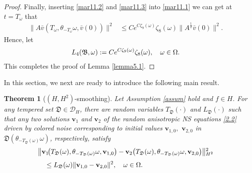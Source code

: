 \documentclass{elsarticle}
\newtheorem{theorem}{Theorem}[section]
\theoremstyle{definition}
\numberwithin{equation}{section}
\newcommand{\D}{\mathcal{D}}
\begin{document}
\begin{proof}
Finally, inserting     \eqref{mar11.2}  and \eqref{mar11.3}  into \eqref{mar11.1}  we can get at $t=T_\omega$ that
\begin{align}
 \|A\bar{v}(T_\omega ,\theta_{-T_\omega }\omega,\bar{v}(0))\|^2
&\leq Ce^{ C \zeta_9(\omega) } \zeta_8(\omega) \|A^\frac12\bar{v}(0)\|^2. \nonumber
\end{align}
Hence, let
\begin{align*}
 L_4 (\mathfrak B, \omega) :=   Ce^{ C \zeta_9(\omega) } \zeta_8(\omega) ,\quad \omega\in \Omega. \qedhere
\end{align*}
This completes the proof of Lemma \ref{lemma5.1}.
\end{proof}


In this section, we next are ready to introduce the following main result.
\begin{theorem}[$(H, H^2)$-smoothing] \label{theorem5.6}
 Let Assumption \ref{assum} hold and $f\in H$. For   any tempered set $\mathfrak D \in \D_H$, there
  are  random variables $T_{{\mathfrak D}} (\cdot)  $   and $ L_{\mathfrak D}(\cdot )$ such that  any two solutions $\textbf{v}_1$ and $\textbf{v}_2$ of the random anisotropic  NS equations \eqref{2.2} driven by colored noise corresponding to initial values   $\textbf{v}_{1,0},$ $ \textbf{v}_{2,0}$ in $\mathfrak D \left (\theta_{-T_{\mathfrak D}(\omega)}\omega \right)$, respectively, satisfy
  \begin{align}
  &
  \big\|\textbf{v}_1 \!  \big (T_{\mathfrak D}(\omega),\theta_{-T_{\mathfrak D}(\omega)}\omega,\textbf{v}_{1,0}\big)
  -\textbf{v}_2 \big (T_{\mathfrak D}(\omega),\theta_{-T_{\mathfrak D}(\omega)}\omega,\textbf{v}_{2,0} \big) \big \|{^2_{H^2}}  \notag \\[0.8ex]
&\quad \leq  L_{\mathfrak D} (\omega)\|\textbf{v}_{1,0}-\textbf{v}_{2,0}\|^2,\quad \omega\in \Omega.\label{sep5.1}
\end{align}
\end{theorem}
\end{document}
